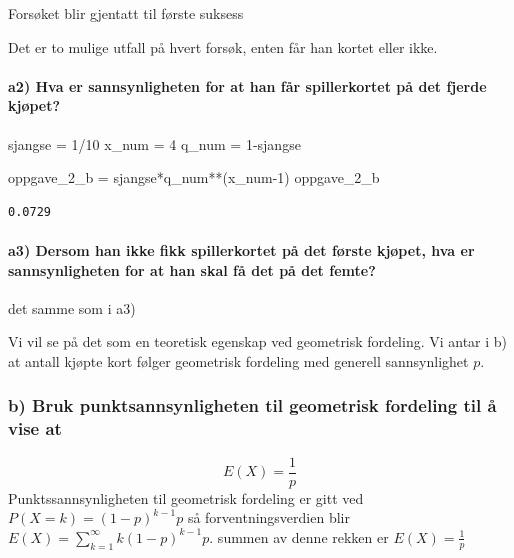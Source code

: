 \documentclass[
  12pt,
  a4paper,
  DIV=11,
  numbers=noendperiod]{scrartcl}
\let\oldparagraph\paragraph
\renewcommand{\paragraph}[1]{\oldparagraph{#1}\mbox{}}
\newenvironment{Shaded}{\begin{snugshade}}{\end{snugshade}}
\newcommand{\DecValTok}[1]{\textcolor[rgb]{0.68,0.00,0.00}{#1}}
\newcommand{\NormalTok}[1]{\textcolor[rgb]{0.00,0.23,0.31}{#1}}
\newcommand{\OperatorTok}[1]{\textcolor[rgb]{0.37,0.37,0.37}{#1}}
\begin{document}
Forsøket blir gjentatt til første suksess

Det er to mulige utfall på hvert forsøk, enten får han kortet eller
ikke.

\paragraph{a2) Hva er sannsynligheten for at han får spillerkortet på
det fjerde
kjøpet?}\label{a2-hva-er-sannsynligheten-for-at-han-fuxe5r-spillerkortet-puxe5-det-fjerde-kjuxf8pet}

\begin{Shaded}
\begin{Highlighting}[]
\NormalTok{sjangse }\OperatorTok{=} \DecValTok{1}\OperatorTok{/}\DecValTok{10}
\NormalTok{x\_num }\OperatorTok{=} \DecValTok{4}
\NormalTok{q\_num }\OperatorTok{=} \DecValTok{1}\OperatorTok{{-}}\NormalTok{sjangse}

\NormalTok{oppgave\_2\_b }\OperatorTok{=}\NormalTok{ sjangse}\OperatorTok{*}\NormalTok{q\_num}\OperatorTok{**}\NormalTok{(x\_num}\OperatorTok{{-}}\DecValTok{1}\NormalTok{)}
\NormalTok{oppgave\_2\_b}
\end{Highlighting}
\end{Shaded}

\begin{verbatim}
0.0729
\end{verbatim}

\paragraph{a3) Dersom han ikke fikk spillerkortet på det første kjøpet,
hva er sannsynligheten for at han skal få det på det
femte?}\label{a3-dersom-han-ikke-fikk-spillerkortet-puxe5-det-fuxf8rste-kjuxf8pet-hva-er-sannsynligheten-for-at-han-skal-fuxe5-det-puxe5-det-femte}

det samme som i a3)

Vi vil se på det som en teoretisk egenskap ved geometrisk fordeling. Vi
antar i b) at antall kjøpte kort følger geometrisk fordeling med
generell sannsynlighet \(p\).

\subsubsection{b) Bruk punktsannsynligheten til geometrisk fordeling til
å vise
at}\label{b-bruk-punktsannsynligheten-til-geometrisk-fordeling-til-uxe5-vise-at}

\[ E(X) = \frac{1}{p} \] Punktssannsynligheten til geometrisk fordeling
er gitt ved \(P(X = k) = (1-p)^{k-1}p\) så forventningsverdien blir
\(E(X) = \sum_{k=1}^{\infty} k(1-p)^{k-1}p\). summen av denne rekken er
\(E(X) = \frac{1}{p}\)
\end{document}
